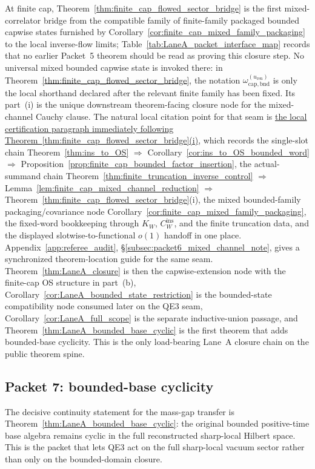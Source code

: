 At finite cap, Theorem~\ref{thm:finite_cap_flowed_sector_bridge} is the first mixed-correlator bridge from the compatible family of finite-family packaged bounded capwise states furnished by Corollary~\ref{cor:finite_cap_mixed_family_packaging} to the local inverse-flow limits; Table~\ref{tab:LaneA_packet_interface_map} records that no earlier Packet~5 theorem should be read as proving this closure step.
No universal mixed bounded capwise state is invoked there: in Theorem~\ref{thm:finite_cap_flowed_sector_bridge}, the notation $\omega_{\mathrm{cap,bnd}}^{(u_{\mathrm{ren}})}$ is only the local shorthand declared after the relevant finite family has been fixed.
Its part~(i) is the unique downstream theorem-facing closure node for the mixed-channel Cauchy clause.
The natural local citation point for that seam is \hyperref[par:finite_cap_mixed_channel_certification]{the local certification paragraph immediately following Theorem~\ref{thm:finite_cap_flowed_sector_bridge}(i)}, which records the single-slot chain Theorem~\ref{thm:ins_to_OS} $\Rightarrow$ Corollary~\ref{cor:ins_to_OS_bounded_word} $\Rightarrow$ Proposition~\ref{prop:finite_cap_bounded_factor_insertion}, the actual-summand chain Theorem~\ref{thm:finite_truncation_inverse_control} $\Rightarrow$ Lemma~\ref{lem:finite_cap_mixed_channel_reduction} $\Rightarrow$ Theorem~\ref{thm:finite_cap_flowed_sector_bridge}(i), the mixed bounded-family packaging/covariance node Corollary~\ref{cor:finite_cap_mixed_family_packaging}, the fixed-word bookkeeping through $K_W$, $C_W^{\mathrm{ins}}$, and the finite truncation data, and the displayed slotwise-to-functional $o(1)$ handoff in one place.
Appendix~\ref{app:referee_audit}, \S\ref{subsec:packet6_mixed_channel_note}, gives a synchronized theorem-location guide for the same seam.
Theorem~\ref{thm:LaneA_closure} is then the capwise-extension node with the finite-cap OS structure in part~(b), Corollary~\ref{cor:LaneA_bounded_state_restriction} is the bounded-state compatibility node consumed later on the QE3 seam, Corollary~\ref{cor:LaneA_full_scope} is the separate inductive-union passage, and Theorem~\ref{thm:LaneA_bounded_base_cyclic} is the first theorem that adds bounded-base cyclicity.
This is the only load-bearing Lane~A closure chain on the public theorem spine.

\subsection{Packet 7: bounded-base cyclicity}

The decisive continuity statement for the mass-gap transfer is Theorem~\ref{thm:LaneA_bounded_base_cyclic}: the original bounded positive-time base algebra remains cyclic in the full reconstructed sharp-local Hilbert space.
This is the packet that lets QE3 act on the full sharp-local vacuum sector rather than only on the bounded-domain closure.

